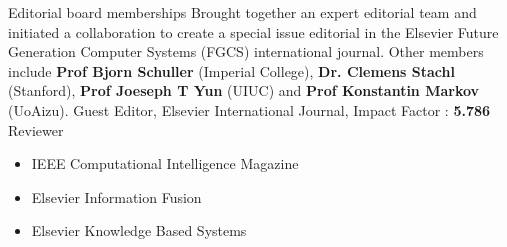 
%
%
%

\begin{projects}
	\project
	{Editorial board memberships}{}
	{}
	{Brought together an expert editorial team and initiated a collaboration to create a special issue editorial in the Elsevier Future Generation Computer Systems (FGCS) international journal. Other members include \textbf{Prof Bjorn Schuller} (Imperial College), \textbf{Dr. Clemens Stachl} (Stanford), \textbf{Prof Joeseph T Yun} (UIUC) and \textbf{Prof Konstantin Markov} (UoAizu).
	}
	{Guest Editor, Elsevier International Journal, Impact Factor : \textbf{5.786}}
	\project
	{Reviewer}{}
	{\begin{itemize}
	    \item IEEE Computational Intelligence Magazine
	    \item Elsevier Information Fusion
        \item Elsevier Knowledge Based Systems
      \end{itemize}}
	{}
	{}
	
\end{projects}